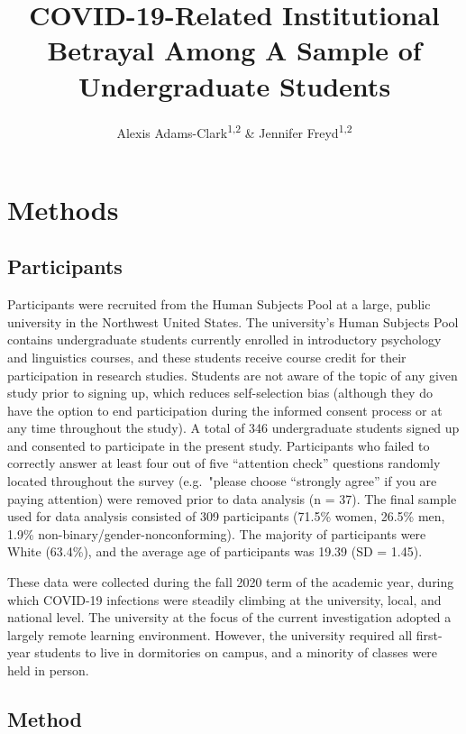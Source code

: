 \documentclass[
  english,
  man,draftall]{apa6}
\title{COVID-19-Related Institutional Betrayal Among A Sample of Undergraduate Students}
\author{Alexis Adams-Clark\textsuperscript{1,2} \& Jennifer Freyd\textsuperscript{1,2}}
\date{}
\affiliation{\vspace{0.5cm}\textsuperscript{1} University of Oregon\\\textsuperscript{2} Center for Institutional Courage}
\begin{document}
\maketitle

\hypertarget{methods}{%
\section{Methods}\label{methods}}

\hypertarget{participants}{%
\subsection{Participants}\label{participants}}

Participants were recruited from the Human Subjects Pool at a large, public university in the Northwest United States. The university's Human Subjects Pool contains undergraduate students currently enrolled in introductory psychology and linguistics courses, and these students receive course credit for their participation in research studies. Students are not aware of the topic of any given study prior to signing up, which reduces self-selection bias (although they do have the option to end participation during the informed consent process or at any time throughout the study). A total of 346 undergraduate students signed up and consented to participate in the present study. Participants who failed to correctly answer at least four out of five \enquote{attention check} questions randomly located throughout the survey (e.g.~"please choose \enquote{strongly agree} if you are paying attention) were removed prior to data analysis (n = 37). The final sample used for data analysis consisted of 309 participants (71.5\% women, 26.5\% men, 1.9\% non-binary/gender-nonconforming). The majority of participants were White (63.4\%), and the average age of participants was 19.39 (SD = 1.45).

These data were collected during the fall 2020 term of the academic year, during which COVID-19 infections were steadily climbing at the university, local, and national level. The university at the focus of the current investigation adopted a largely remote learning environment. However, the university required all first-year students to live in dormitories on campus, and a minority of classes were held in person.

\hypertarget{method}{%
\subsection{Method}\label{method}}
\end{document}
